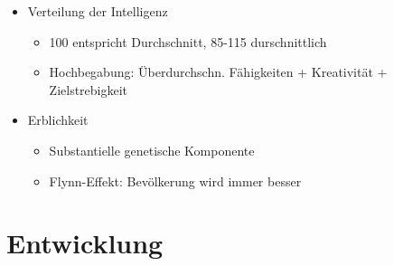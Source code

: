 \documentclass[11pt, paper=a4, twocolumn]{scrartcl}
\begin{document}
\begin{itemize}
		\item Verteilung der Intelligenz
			\begin{itemize}
				\item 100 entspricht Durchschnitt, 85-115 durschnittlich
				\item Hochbegabung: Überdurchschn. Fähigkeiten + 
					Kreativität + Zielstrebigkeit
			\end{itemize}

		\item Erblichkeit
			\begin{itemize}
				\item Substantielle genetische Komponente
				\item Flynn-Effekt: Bevölkerung wird immer besser
			\end{itemize}
	\end{itemize}
	\section{Entwicklung}
\end{document}
